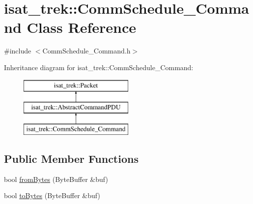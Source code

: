 \hypertarget{classisat__trek_1_1_comm_schedule___command}{}\section{isat\+\_\+trek\+:\+:Comm\+Schedule\+\_\+\+Command Class Reference}
\label{classisat__trek_1_1_comm_schedule___command}


{\ttfamily \#include $<$Comm\+Schedule\+\_\+\+Command.\+h$>$}

Inheritance diagram for isat\+\_\+trek\+:\+:Comm\+Schedule\+\_\+\+Command\+:\begin{figure}[H]
\begin{center}
\leavevmode
\includegraphics[height=3.000000cm]{classisat__trek_1_1_comm_schedule___command}
\end{center}
\end{figure}
\subsection*{Public Member Functions}
\begin{DoxyCompactItemize}
\item 
bool \hyperlink{classisat__trek_1_1_comm_schedule___command_a319741c38912475de0ded5d112fb8d5a}{from\+Bytes} (Byte\+Buffer \&buf)
\item 
bool \hyperlink{classisat__trek_1_1_comm_schedule___command_abb60891e0c1a5337b89262cb6ebe5439}{to\+Bytes} (Byte\+Buffer \&buf)
\end{DoxyCompactItemize}
